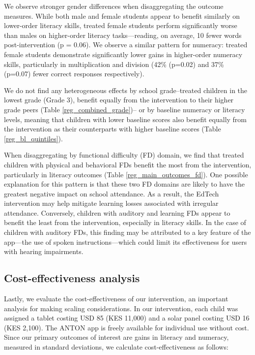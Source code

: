 \documentclass[hidelinks,12pt]{article}
\begin{document}
\begin{singlespace}
We observe stronger gender differences when disaggregating the outcome measures. While both male and female students appear to benefit similarly on lower-order literacy skills, treated female students perform significantly worse than males on higher-order literacy tasks—reading, on average, 10 fewer words post-intervention (p = 0.06). We observe a similar pattern for numeracy: treated female students demonstrate significantly lower gains in higher-order numeracy skills, particularly in multiplication and division (42\% (p=0.02) and 37\% (p=0.07) fewer correct responses respectively). 

We do not find any heterogeneous effects by school grade–treated children in the lowest grade (Grade 3), benefit equally from the intervention to their higher grade peers (Table \ref{reg_combined_grade})– or by baseline numeracy or literacy levels, meaning that children with lower baseline scores also benefit equally from the intervention as their counterparts with higher baseline scores (Table \ref{reg_bl_quintiles}).

When disaggregating by functional difficulty (FD) domain, we find that treated children with physical and behavioral FDs benefit the most from the intervention, particularly in literacy outcomes (Table \ref{reg_main_outcomes_fd}). One possible explanation for this pattern is that these two FD domains are likely to have the greatest negative impact on school attendance. As a result, the EdTech intervention may help mitigate learning losses associated with irregular attendance. Conversely, children with auditory and learning FDs appear to benefit the least from the intervention, especially in literacy skills. In the case of children with auditory FDs, this finding may be attributed to a key feature of the app—the use of spoken instructions—which could limit its effectiveness for users with hearing impairments.

\subsection{Cost-effectiveness analysis}
Lastly, we evaluate the cost-effectiveness of our intervention, an important analysis for making scaling considerations. In our intervention, each child was assigned a tablet costing USD 85 (KES 11,000) and a solar panel costing USD 16 (KES 2,100). The ANTON app is freely available for individual use without cost. Since our primary outcomes of interest are gains in literacy and numeracy, measured in standard deviations, we calculate cost-effectiveness as follows:


\end{singlespace}
\end{document}

